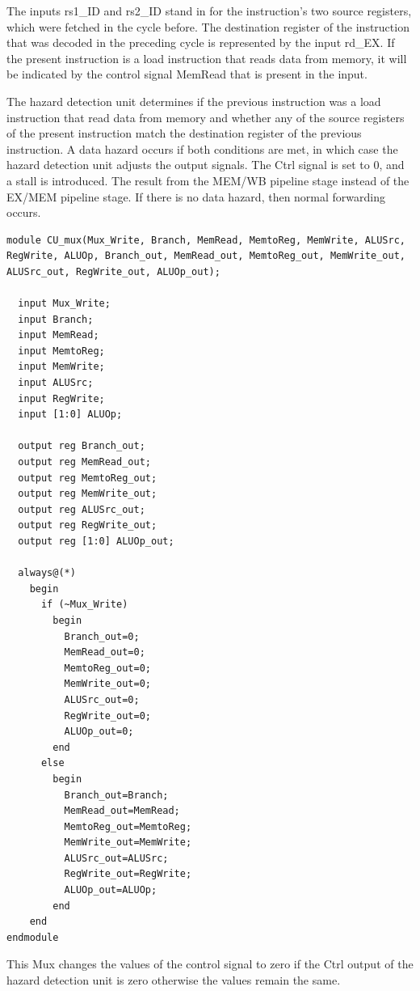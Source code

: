 \documentclass{article}
\begin{document}
The inputs rs1\_ID and rs2\_ID stand in for the instruction's two source registers, which were fetched in the cycle before. The destination register of the instruction that was decoded in the preceding cycle is represented by the input rd\_EX. If the present instruction is a load instruction that reads data from memory, it will be indicated by the control signal MemRead that is present in the input.

The hazard detection unit determines if the previous instruction was a load instruction that read data from memory and whether any of the source registers of the present instruction match the destination register of the previous instruction. A data hazard occurs if both conditions are met, in which case the hazard detection unit adjusts the output signals. The Ctrl signal is set to 0, and a stall is introduced. The result from the MEM/WB pipeline stage instead of the EX/MEM pipeline stage. If there is no data hazard, then normal forwarding occurs.

\begin{lstlisting}[caption={Hazard Detection MUX}, captionpos=b, language=RISC-V]
module CU_mux(Mux_Write, Branch, MemRead, MemtoReg, MemWrite, ALUSrc, RegWrite, ALUOp, Branch_out, MemRead_out, MemtoReg_out, MemWrite_out, ALUSrc_out, RegWrite_out, ALUOp_out);
  
  input Mux_Write;
  input Branch;
  input MemRead;
  input MemtoReg;
  input MemWrite;
  input ALUSrc;
  input RegWrite;
  input [1:0] ALUOp;

  output reg Branch_out;
  output reg MemRead_out;
  output reg MemtoReg_out; 
  output reg MemWrite_out;
  output reg ALUSrc_out;
  output reg RegWrite_out;
  output reg [1:0] ALUOp_out;
  
  always@(*)
    begin
      if (~Mux_Write)
        begin
          Branch_out=0;
          MemRead_out=0;
          MemtoReg_out=0;
          MemWrite_out=0;
          ALUSrc_out=0;
          RegWrite_out=0;
          ALUOp_out=0;
        end
      else
        begin
          Branch_out=Branch;
          MemRead_out=MemRead;
          MemtoReg_out=MemtoReg;
          MemWrite_out=MemWrite;
          ALUSrc_out=ALUSrc;
          RegWrite_out=RegWrite;
          ALUOp_out=ALUOp;
        end
    end
endmodule
\end{lstlisting}

This Mux changes the values of the control signal to zero if the Ctrl output of the hazard detection unit is zero otherwise the values remain the same.
\end{document}
